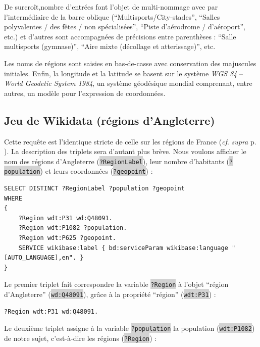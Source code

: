 \documentclass[hidelinks, 12pt]{report}
\newcommand{\code}[1]{\colorbox{LightGray}{\texttt{#1}}}
\begin{document}
De surcroît,nombre d'entrées font l'objet de multi-nommage avec par l'intermédiaire de la barre oblique (\enquote{Multisports/City-stades}, \enquote{Salles polyvalentes / des fêtes / non spécialisées}, \enquote{Piste d’aérodrome / d'aéroport}, etc.) et d'autres sont accompagnées de précisions entre parenthèses : \enquote{Salle multisports (gymnase)}, \enquote{Aire mixte (décollage et atterissage)}, etc.

Les noms de régions sont saisies en bas-de-casse avec conservation des majuscules initiales. Enfin, la longitude et la latitude se basent sur le système \textit{WGS 84} -- \textit{World Geodetic System 1984}, un système géodésique mondial comprenant, entre autres, un modèle pour l'expression de coordonnées.





%





\subsection{Jeu de Wikidata (régions d'Angleterre)}

\label{queryeng}Cette requête est l'identique stricte de celle sur les régions de France (\textit{cf}. \textit{supra} p. \pageref{queryfr}). La description des triplets sera d'autant plus brève. Nous voulons afficher le nom des régions d'Angleterre (\code{?RegionLabel}), leur nombre d'habitants (\code{?population}) et leurs coordonnées (\code{?geopoint}) :

\begin{lstlisting}[language=SPARQL]
SELECT DISTINCT ?RegionLabel ?population ?geopoint
WHERE
{
	?Region wdt:P31 wd:Q48091.
	?Region wdt:P1082 ?population.
	?Region wdt:P625 ?geopoint.
	SERVICE wikibase:label { bd:serviceParam wikibase:language "[AUTO_LANGUAGE],en". }
}
\end{lstlisting}

Le premier triplet fait correspondre la variable \code{?Region} à l'objet \enquote{région d'Angleterre} (\code{wd:Q48091}), grâce à la propriété \enquote{région} (\code{wdt:P31}) :

\begin{lstlisting}[language=SPARQL]
	?Region wdt:P31 wd:Q48091.
\end{lstlisting}

Le deuxième triplet assigne à la variable \code{?population} la population (\code{wdt:P1082}) de notre sujet, c'est-à-dire les régions (\code{?Region}) :
\end{document}
